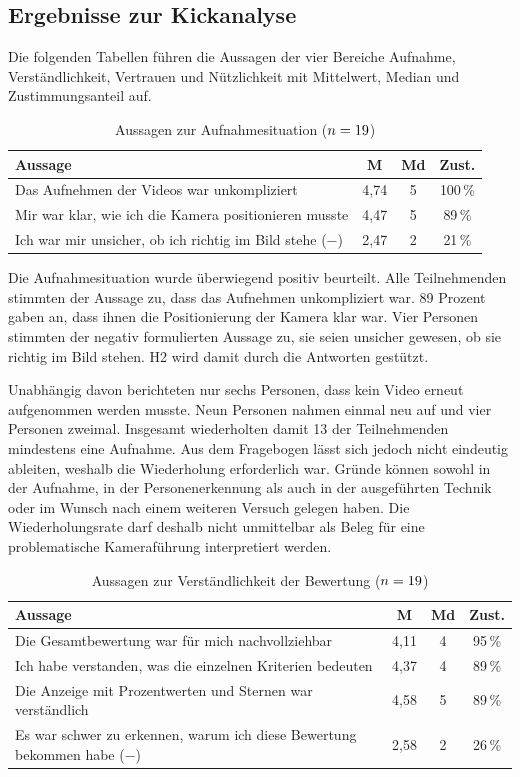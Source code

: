 \documentclass[intern]{cgMA}
\begin{document}
\subsection{Ergebnisse zur Kickanalyse}
\label{sec:eval_kick}
Die folgenden Tabellen führen die Aussagen der vier Bereiche Aufnahme, Verständlichkeit, Vertrauen und Nützlichkeit mit Mittelwert, Median und Zustimmungsanteil auf.

\begin{table}[htbp]
\centering
\small
\begin{tabular}{p{} c c c}
\hline
\textbf{Aussage} & \textbf{M} & \textbf{Md} & \textbf{Zust.} \\ \hline
Das Aufnehmen der Videos war unkompliziert & 4,74 & 5 & 100\,\% \\
Mir war klar, wie ich die Kamera positionieren musste & 4,47 & 5 & 89\,\% \\
Ich war mir unsicher, ob ich richtig im Bild stehe ($-$) & 2,47 & 2 & 21\,\% \\ \hline
\end{tabular}
\caption{Aussagen zur Aufnahmesituation ($n=19$)}
\label{tab:eval_aufnahme}
\end{table}

Die Aufnahmesituation wurde überwiegend positiv beurteilt. Alle Teilnehmenden stimmten der Aussage zu, dass das Aufnehmen unkompliziert war. 89 Prozent gaben an, dass ihnen die Positionierung der Kamera klar war. Vier Personen stimmten der negativ formulierten Aussage zu, sie seien unsicher gewesen, ob sie richtig im Bild stehen. H2 wird damit durch die Antworten gestützt.

Unabhängig davon berichteten nur sechs Personen, dass kein Video erneut aufgenommen werden musste. Neun Personen nahmen einmal neu auf und vier Personen zweimal. Insgesamt wiederholten damit 13 der \Nteiln{} Teilnehmenden mindestens eine Aufnahme. Aus dem Fragebogen lässt sich jedoch nicht eindeutig ableiten, weshalb die Wiederholung erforderlich war. Gründe können sowohl in der Aufnahme, in der Personenerkennung als auch in der ausgeführten Technik oder im Wunsch nach einem weiteren Versuch gelegen haben. Die Wiederholungsrate darf deshalb nicht unmittelbar als Beleg für eine problematische Kameraführung interpretiert werden.

\begin{table}[htbp]
\centering
\small
\begin{tabular}{p{} c c c}
\hline
\textbf{Aussage} & \textbf{M} & \textbf{Md} & \textbf{Zust.} \\ \hline
Die Gesamtbewertung war für mich nachvollziehbar & 4,11 & 4 & 95\,\% \\
Ich habe verstanden, was die einzelnen Kriterien bedeuten & 4,37 & 4 & 89\,\% \\
Die Anzeige mit Prozentwerten und Sternen war verständlich & 4,58 & 5 & 89\,\% \\
Es war schwer zu erkennen, warum ich diese Bewertung bekommen habe ($-$) & 2,58 & 2 & 26\,\% \\ \hline
\end{tabular}
\caption{Aussagen zur Verständlichkeit der Bewertung ($n=19$)}
\label{tab:eval_verstaendlich}
\end{table}
\end{document}
